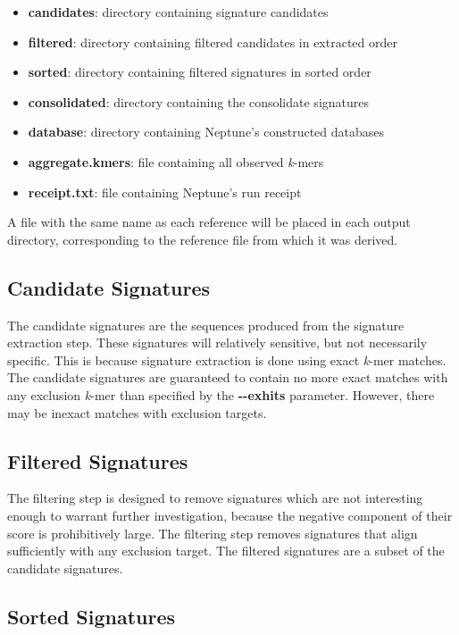 \documentclass[a4paper,10pt]{article}
\begin{document}
\begin{itemize}
  \item \textbf{candidates}: directory containing signature candidates
  \item \textbf{filtered}: directory containing filtered candidates in extracted order
  \item \textbf{sorted}: directory containing filtered signatures in sorted order
  \item \textbf{consolidated}: directory containing the consolidate signatures
  \item \textbf{database}: directory containing Neptune's constructed databases
  \item \textbf{aggregate.kmers}: file containing all observed \textit{k}-mers
  \item \textbf{receipt.txt}: file containing Neptune's run receipt
\end{itemize}

A file with the same name as each reference will be placed in each output directory, corresponding to the reference file from which it was derived.

\subsection{Candidate Signatures}

The candidate signatures are the sequences produced from the signature extraction step. These signatures will relatively sensitive, but not necessarily specific. This is because signature extraction is done using exact \textit{k}-mer matches. The candidate signatures are guaranteed to contain no more exact matches with any exclusion \textit{k}-mer than specified by the \mbox{\textbf{-{}-exhits}} parameter. However, there may be inexact matches with exclusion targets.

\subsection{Filtered Signatures}

The filtering step is designed to remove signatures which are not interesting enough to warrant further investigation, because the negative component of their score is prohibitively large. The filtering step removes signatures that align sufficiently with any exclusion target. The filtered signatures are a subset of the candidate signatures.

\subsection{Sorted Signatures}
\end{document}
